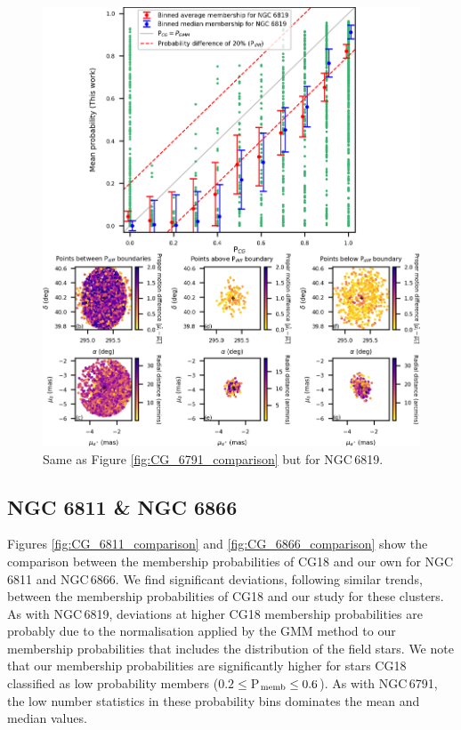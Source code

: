 \begin{figure}[hbtp]
    \centering
    \includegraphics[width=\linewidth]{Chapter4/NGC6819_CG_comparison.png}
    \caption[Comparison of membership probabilities for NGC\,6819]{Same as Figure \ref{fig:CG_6791_comparison} but for NGC\,6819.}
    \label{fig:CG_6819_comparison}
\end{figure}

\subsection{NGC 6811 \& NGC 6866}

Figures \ref{fig:CG_6811_comparison} and \ref{fig:CG_6866_comparison} show the comparison between the membership probabilities of CG18 and our own for NGC\,6811 and NGC\,6866. We find significant deviations, following similar trends, between the membership probabilities of CG18 and our study for these clusters. As with NGC\,6819, deviations at higher CG18 membership probabilities are probably due to the normalisation applied by the GMM method to our membership probabilities that includes the distribution of the field stars. We note that our membership probabilities are significantly higher for stars CG18 classified as low probability members ($0.2 \leq $P$_{\rm memb} \leq 0.6$). As with NGC\,6791, the low number statistics in these probability bins dominates the mean and median values.

